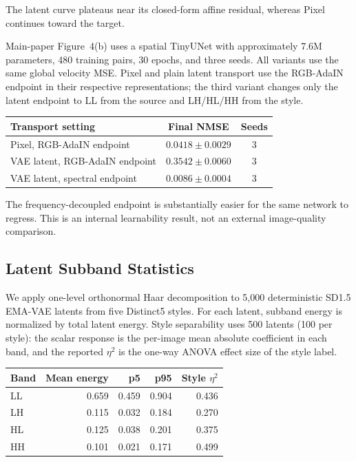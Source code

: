 \documentclass[letterpaper]{article}
\begin{document}
The latent curve plateaus near its closed-form affine residual, whereas Pixel continues
toward the target.

Main-paper Figure~4(b) uses a spatial TinyUNet with approximately 7.6M parameters, 480 training pairs,
30 epochs, and three seeds. All variants use the same global velocity MSE. Pixel and plain
latent transport use the RGB-AdaIN endpoint in their respective representations; the third
variant changes only the latent endpoint to LL from the source and LH/HL/HH from the style.

\begin{center}
\footnotesize
\setlength{\tabcolsep}{4pt}
\begin{tabular}{@{}lcc@{}}
\toprule
Transport setting & Final NMSE & Seeds \\
\midrule
Pixel, RGB-AdaIN endpoint & $0.0418\pm0.0029$ & 3 \\
VAE latent, RGB-AdaIN endpoint & $0.3542\pm0.0060$ & 3 \\
VAE latent, spectral endpoint & $0.0086\pm0.0004$ & 3 \\
\bottomrule
\end{tabular}
\end{center}

The frequency-decoupled endpoint is substantially easier for the same network to regress.
This is an internal learnability result, not an external image-quality comparison.

\subsection{Latent Subband Statistics}

We apply one-level orthonormal Haar decomposition to 5,000 deterministic SD1.5 EMA-VAE
latents from five Distinct5 styles. For each latent, subband energy is normalized by total
latent energy. Style separability uses 500 latents (100 per style): the scalar response is
the per-image mean absolute coefficient in each band, and the reported $\eta^2$ is the
one-way ANOVA effect size of the style label.

\begin{center}
\footnotesize
\begin{tabular}{lrrrr}
\toprule
Band & Mean energy & p5 & p95 & Style $\eta^2$ \\
\midrule
LL & 0.659 & 0.459 & 0.904 & 0.436 \\
LH & 0.115 & 0.032 & 0.184 & 0.270 \\
HL & 0.125 & 0.038 & 0.201 & 0.375 \\
HH & 0.101 & 0.021 & 0.171 & 0.499 \\
\bottomrule
\end{tabular}
\end{center}
\end{document}

